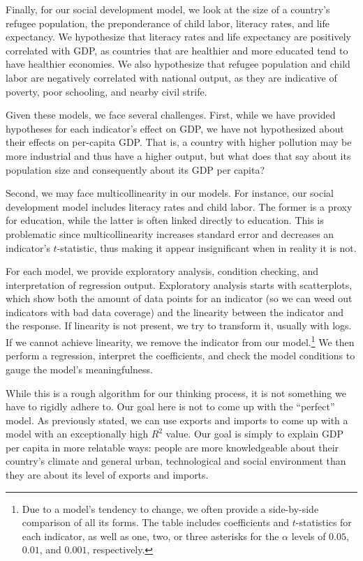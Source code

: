 \documentclass[11pt]{article}
\begin{document}
Finally, for our social development model, we look at the size of a country's refugee population, the preponderance of child labor, literacy rates, and life expectancy. We hypothesize that literacy rates and life expectancy are positively correlated with GDP, as countries that are healthier and more educated tend to have healthier economies. We also hypothesize that refugee population and child labor are negatively correlated with national output, as they are indicative of poverty, poor schooling, and nearby civil strife.

Given these models, we face several challenges. First, while we have provided hypotheses for each indicator's effect on GDP, we have not hypothesized about their effects on per-capita GDP. That is, a country with higher pollution may be more industrial and thus have a higher output, but what does that say about its population size and consequently about its GDP per capita?

Second, we may face multicollinearity in our models. For instance, our social development model includes literacy rates and child labor. The former is a proxy for education, while the latter is often linked directly to education. This is problematic since multicollinearity increases standard error and decreases an indicator's $t$-statistic, thus making it appear insignificant when in reality it is not.

For each model, we provide exploratory analysis, condition checking, and interpretation of regression output. Exploratory analysis starts with scatterplots, which show both the amount of data points for an indicator (so we can weed out indicators with bad data coverage) and the linearity between the indicator and the response. If linearity is not present, we try to transform it, usually with logs. If we cannot achieve linearity, we remove the indicator from our model.\footnote{Due to a model's tendency to change, we often provide a side-by-side comparison of all its forms. The table includes coefficients and $t$-statistics for each indicator, as well as one, two, or three asterisks for the $\alpha$ levels of $0.05$, $0.01$, and $0.001$, respectively.} We then perform a regression, interpret the coefficients, and check the model conditions to gauge the model's meaningfulness.

While this is a rough algorithm for our thinking process, it is not something we have to rigidly adhere to. Our goal here is not to come up with the ``perfect'' model. As previously stated, we can use exports and imports to come up with a model with an exceptionally high $R^2$ value. Our goal is simply to explain GDP per capita in more relatable ways: people are more knowledgeable about their country's climate and general urban, technological and social environment than they are about its level of exports and imports.
\end{document}
